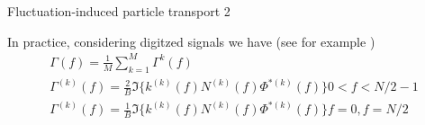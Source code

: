 \documentclass[t,10pt]{beamer}
\begin{document}
\begin{frame}{Fluctuation-induced particle transport 2}
\begin{itemize}
{\footnotesize
\item In practice, considering digitzed signals we have
  \footnotesize{(see for example \parencite{Antoni:2000bn})}
\begin{gather*}
\Gamma(f)=\frac{1}{M}\sum_{k=1}^{M}\Gamma^{k}(f) \\
\Gamma^{(k)}(f)=\frac{2}{B}\Im\{k^{(k)}(f)N^{(k)}(f)\Phi^{*(k)}(f)\}
 0<f<N/2-1 \\
\Gamma^{(k)}(f)=\frac{1}{B}\Im\{k^{(k)}(f)N^{(k)}(f)\Phi^{*(k)}(f)\}
 f=0,f=N/2
\end{gather*}
}



\end{itemize}
\end{frame}
\end{document}
